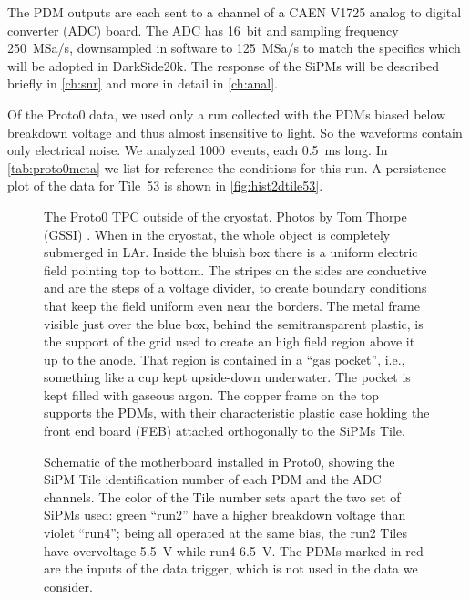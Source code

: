 The PDM outputs are each sent to a channel of a CAEN V1725 analog to digital
converter (ADC) board. The ADC has \SI{16}{bit} and sampling frequency
\SI{250}{MSa/s}, downsampled in software to \SI{125}{MSa/s} to match the
specifics which will be adopted in DarkSide20k. The response of the SiPMs will
be described briefly in \autoref{ch:snr} and more in detail in
\autoref{ch:anal}.

Of the Proto0 data, we used only a run collected with the PDMs biased below
breakdown voltage and thus almost insensitive to light. So the waveforms
contain only electrical noise. We analyzed 1000~events, each \SI{0.5}{ms} long.
In \autoref{tab:proto0meta} we list for reference the conditions for this run.
A persistence plot of the data for Tile~53 is shown in
\autoref{fig:hist2dtile53}.

\begin{figure}
    
    
    \caption{\label{fig:proto0} The Proto0 TPC outside of the cryostat. Photos
    by Tom Thorpe (GSSI) \cite{proto0photos}. When in the cryostat, the whole
    object is completely submerged in LAr. Inside the bluish box there is a
    uniform electric field pointing top to bottom. The stripes on the sides are
    conductive and are the steps of a voltage divider, to create boundary
    conditions that keep the field uniform even near the borders. The metal
    frame visible just over the blue box, behind the semitransparent plastic,
    is the support of the grid used to create an high field region above it up
    to the anode. That region is contained in a ``gas pocket'', i.e., something
    like a cup kept upside-down underwater. The pocket is kept filled with
    gaseous argon. The copper frame on the top supports the PDMs, with their
    characteristic plastic case holding the front end board (FEB) attached
    orthogonally to the SiPMs Tile.}
    
\end{figure}

\begin{figure}
    
    
    \caption{\label{fig:pdmadcch} Schematic of the motherboard installed in
    Proto0, showing the SiPM Tile identification number of each PDM and the ADC
    channels. The color of the Tile number sets apart the two set of SiPMs
    used: green ``run2'' have a higher breakdown voltage than violet ``run4'';
    being all operated at the same bias, the run2 Tiles have overvoltage
    \SI{5.5}{V} while run4 \SI{6.5}{V}. The PDMs marked in red are the inputs
    of the data trigger, which is not used in the data we consider.}

\end{figure}

